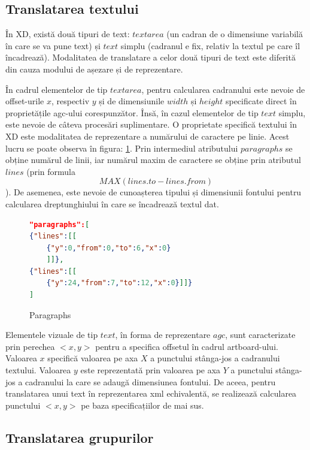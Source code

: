 \subsection{Translatarea textului}

În XD, există două tipuri de text: $text area$ (un cadran de o dimensiune variabilă în care se va pune text) și $text$ simplu (cadranul e fix, relativ la textul pe care îl încadrează). Modalitatea de translatare a celor două tipuri de text este diferită din cauza modului de așezare și de reprezentare. 

În cadrul elementelor de tip $text area$, pentru calcularea cadranului este nevoie de offset-urile $x$, respectiv $y$ și de dimensiunile $width$ și $height$ specificate direct în proprietățile agc-ului corespunzător. Însă, în cazul elementelor de tip $text$ simplu, este nevoie de câteva procesări suplimentare.
O proprietate specifică textului în XD este modalitatea de reprezentare a numărului de caractere pe linie. Acest lucru se poate observa în figura: \ref{fig:Paragraphs}. Prin intermediul atributului $paragraphs$ se obține numărul de linii, iar numărul maxim de caractere se obține prin atributul $lines$ (prin formula  \[MAX(lines.to - lines.from)\]). De asemenea, este nevoie de cunoașterea tipului și dimensiunii fontului pentru calcularea dreptunghiului în care se încadrează textul dat.

\begin{figure}[!htbp]
\begin{lstlisting}[language=json,firstnumber=1]
"paragraphs":[
{"lines":[[
    {"y":0,"from":0,"to":6,"x":0}
    ]]},
{"lines":[[
    {"y":24,"from":7,"to":12,"x":0}]]}
]
\end{lstlisting}
\caption{Paragraphs} \label{fig:Paragraphs}
\end{figure}

Elementele vizuale de tip $text$, în forma de reprezentare $agc$, sunt caracterizate prin perechea $<x, y>$ pentru a specifica offsetul în cadrul artboard-ului. Valoarea $x$ specifică valoarea pe axa $X$ a punctului stânga-jos a cadranului textului. Valoarea $y$ este reprezentată prin valoarea pe axa $Y$ a punctului stânga-jos a cadranului la care se adaugă dimensiunea fontului. De aceea, pentru translatarea unui text în reprezentarea xml echivalentă, se realizează calcularea punctului $<x, y>$ pe baza specificațiilor de mai sus.

\subsection{Translatarea grupurilor}

